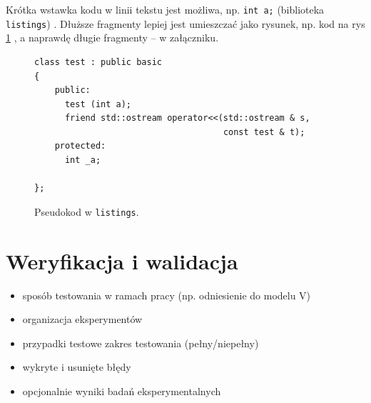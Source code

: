 \documentclass[a4paper,twoside,12pt]{book}
\begin{document}
Krótka wstawka kodu w linii tekstu jest możliwa, np.  \lstinline|int a;| (biblioteka \texttt{listings})%
. 
Dłuższe fragmenty lepiej jest umieszczać jako rysunek, np. kod na rys \ref{fig:pseudokod:listings}%
, a naprawdę długie fragmenty – w załączniku.


\begin{figure}
\centering
\begin{lstlisting}
class test : public basic
{
    public:
      test (int a);
      friend std::ostream operator<<(std::ostream & s, 
                                     const test & t);
    protected:
      int _a;  
      
};
\end{lstlisting}
\caption{Pseudokod w \texttt{listings}.}
\label{fig:pseudokod:listings}
\end{figure}

%      




%
%
%
\chapter{Weryfikacja i walidacja}
\label{ch:06}
\begin{itemize}
\item sposób testowania w ramach pracy (np. odniesienie do modelu V)
\item organizacja eksperymentów
\item przypadki testowe zakres testowania (pełny/niepełny)
\item wykryte i usunięte błędy
\item opcjonalnie wyniki badań eksperymentalnych
\end{itemize}
\end{document}
